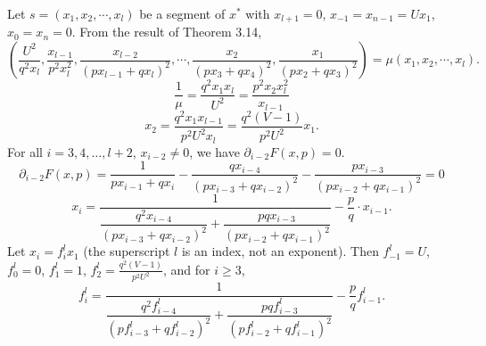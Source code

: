 \documentclass[a4paper,fleqn,numbers]{cas-sc}
\begin{document}
	Let $s=(x_1,x_2,\cdots,x_l)$ be a segment of $x^*$ with $x_{l+1}=0$, $x_{-1}=x_{n-1}=Ux_1$, $x_0=x_n=0$. From the result of Theorem 3.14,
	\[
	\left( \frac{U^2}{q^2 x_l}, \frac{x_{l-1}}{p^2 x_l^2}, \frac{x_{l-2}}{(p x_{l-1} + q x_l)^2}, \cdots, \frac{x_2}{(p x_3 + q x_4)^2}, \frac{x_1}{(p x_2 + q x_3)^2} \right) = \mu (x_1, x_2, \cdots, x_l).
	\]
	\[
	\frac{1}{\mu}=\frac{q^2 x_1 x_l}{U^2}=\frac{p^2 x_2 x_l^2}{x_{l-1}}
	\]
	\[
	x_2 = \frac{q^2 x_1 x_{l-1}}{p^2 U^2 x_l}=\frac{q^2(V-1)}{p^2 U^2}x_1.
	\]
	For all $i=3,4,\ldots,l+2$, $x_{i-2}\neq 0$, we have $\partial_{i-2}F(x,p)=0$.
	\begin{equation*}
		\partial_{i-2}F(x,p) = \frac{1}{px_{i-1} + qx_i} - \frac{qx_{i-4}}{(px_{i-3} + qx_{i-2})^2} - \frac{px_{i-3}}{(px_{i-2} + qx_{i-1})^2} = 0
	\end{equation*}
	\begin{equation*}
		x_i = \frac{1}{\dfrac{q^2x_{i-4}}{(px_{i-3} + qx_{i-2})^2} + \dfrac{pqx_{i-3}}{(px_{i-2} + qx_{i-1})^2}} - \frac{p}{q} \cdot x_{i-1}.
	\end{equation*}
	Let $x_i=f_i^l x_1$ (the superscript $l$ is an index, not an exponent). Then $f_{-1}^l = U$, $f_0^l = 0$, $f_1^l = 1$, $f_2^l = \frac{q^2(V-1)}{p^2 U^2}$, and for $i\geq 3$,
	\begin{equation*}
		f_i^l = \frac{1}{\dfrac{q^2f_{i-4}^l}{(pf_{i-3}^l + qf_{i-2}^l)^2} + \dfrac{pqf_{i-3}^l}{(pf_{i-2}^l + qf_{i-1}^l)^2}} - \frac{p}{q}f_{i-1}^l.
	\end{equation*}
	
\end{document}
